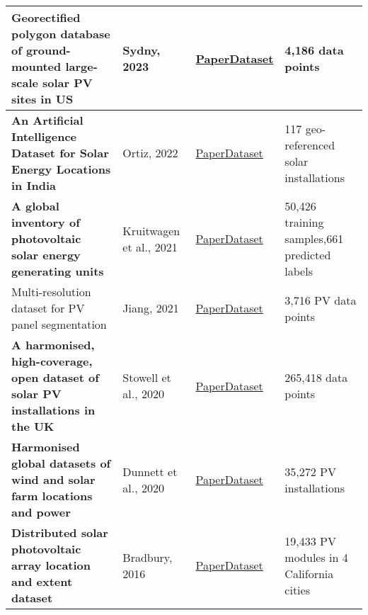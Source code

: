 \begin{table*}[htbp]
\begin{tabularx}{.95\textwidth}{|p{}|p{}|p{}|p{}|}
                \hline
                Georectified polygon database of ground-mounted large-scale solar PV sites in US & Sydny, 2023 & \href{https://doi.org/10.1038/s41597-023-02644-8}{Paper}\linebreak \href{https://www.sciencebase.gov/catalog/item/6671c479d34e84915adb7536}{Dataset} & 4,186 data points \\
                \hline
                \textbf{An Artificial Intelligence Dataset for Solar Energy Locations in India} & Ortiz, 2022 & \href{https://doi.org/10.1038/s41597-022-01499-9}{Paper}\linebreak \href{https://github.com/microsoft/solar-farms-mapping/blob/main/data/solar_farms_india_2021_merged_simplified.geojson}{Dataset} & 117 geo-referenced solar installations \\
                \hline
                \textbf{A global inventory of photovoltaic solar energy generating units} & Kruitwagen et al., 2021 & \href{https://doi.org/10.1038/s41586-021-03957-7}{Paper}\linebreak \href{https://doi.org/10.5281/zenodo.5005867}{Dataset} & 50,426 training samples\linebreak 68,661 predicted labels \\
                \hline
                Multi-resolution dataset for PV panel segmentation & Jiang, 2021 & \href{https://doi.org/10.5194/essd-13-5389-2021}{Paper}\linebreak \href{https://doi.org/10.5281/zenodo.5171712}{Dataset} & 3,716 PV data points \\
                \hline
                \textbf{A harmonised, high-coverage, open dataset of solar PV installations in the UK} & Stowell et al., 2020 & \href{https://doi.org/10.1038/s41597-020-00739-0}{Paper}\linebreak \href{https://zenodo.org/records/4059881}{Dataset} & 265,418 data points \\
                \hline
                \textbf{Harmonised global datasets of wind and solar farm locations and power} & Dunnett et al., 2020 & \href{https://doi.org/10.1038/s41597-020-0469-8}{Paper}\linebreak \href{https://doi.org/10.6084/m9.figshare.11310269.v6}{Dataset} & 35,272 PV installations \\
                \hline
                \textbf{Distributed solar photovoltaic array location and extent dataset} & Bradbury, 2016 & \href{https://doi.org/10.1038/sdata.2016.106}{Paper}\linebreak \href{https://doi.org/10.6084/m9.figshare.3385780.v4}{Dataset} & 19,433 PV modules in 4 California cities \\
                \hline
        \end{tabularx}
        \label{tab:pv_datasets}
    \end{table*}

